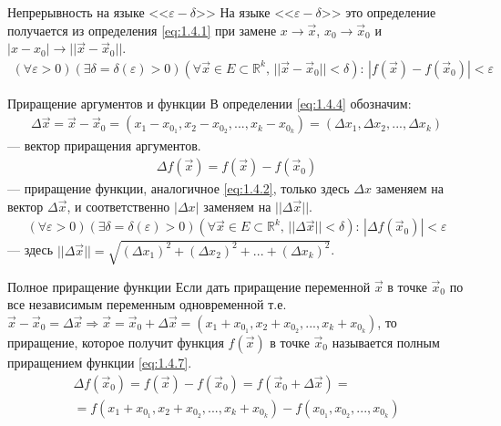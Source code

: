 \begin{tbox}{Непрерывность на языке <<$\varepsilon - \delta$>>}
	На языке <<$\varepsilon - \delta$>> это определение получается из определения \cref{eq:1.4.1} при замене $x \to \vec{x}$, $x_0 \to \vec{x}_0$ и $|x - x_0| \to ||\vec{x} - \vec{x}_0||$.
	\begin{align} \label{eq:1.4.4}
		(\forall \varepsilon > 0)(\exists \delta = \delta(\varepsilon) > 0)(\forall \vec{x} \in E \subset \mathbb{R}^k, \, ||\vec{x} - \vec{x}_0|| < \delta): \, |f(\vec{x}) - f(\vec{x}_0)| < \varepsilon
	\end{align}
\end{tbox}

\begin{tbox}{Приращение аргументов и функции}
	В определении \cref{eq:1.4.4} обозначим:
	\begin{align}
		\Delta \vec{x} = \vec{x} - \vec{x}_0 = (x_1 - x_\text{$0_1$}, x_2 - x_\text{$0_2$}, ..., x_k - x_\text{$0_k$}) = (\Delta x_1, \Delta x_2, ..., \Delta x_k)
	\end{align}
	--- вектор приращения аргументов.
	\begin{align} \label{eq:1.4.5}
		\Delta f(\vec{x}) = f(\vec{x}) - f(\vec{x}_0)
	\end{align}
	--- приращение функции, аналогичное \cref{eq:1.4.2}, только здесь $\Delta x$ заменяем на вектор $\Delta \vec{x}$, и соответственно $|\Delta x|$ заменяем на $||\Delta \vec{x}||$.
	\begin{align} \label{eq:1.4.6}
		(\forall \varepsilon > 0)(\exists \delta = \delta(\varepsilon) > 0)(\forall \vec{x} \in E \subset \mathbb{R}^k, \, ||\Delta \vec{x}|| < \delta): \, |\Delta f(\vec{x}_0)| < \varepsilon
	\end{align}
	--- здесь \(||\Delta \vec{x}|| = \sqrt{(\Delta x_1)^2 + (\Delta x_2)^2 + ... + (\Delta x_k)^2}\).
\end{tbox}

\begin{tbox}{Полное приращение функции}
	Если дать приращение переменной $\vec{x}$ в точке $\vec{x}_0$ по все независимым переменным одновременной т.е. $\vec{x} - \vec{x}_0 = \Delta \vec{x} \Rightarrow \vec{x} = \vec{x}_0 + \Delta \vec{x} = (x_1 + x_\text{$0_1$}, x_2 + x_\text{$0_2$}, ..., x_k + x_\text{$0_k$})$, то приращение, которое получит функция $f(\vec{x})$ в точке $\vec{x}_0$ называется полным приращением функции \cref{eq:1.4.7}.
	\begin{multline} \label{eq:1.4.7}
		\Delta f(\vec{x}_0) = f(\vec{x}) - f(\vec{x}_0) = f(\vec{x}_0 + \Delta \vec{x}) =\\= f(x_1 + x_\text{$0_1$}, x_2 + x_\text{$0_2$}, ..., x_k + x_\text{$0_k$}) - f(x_\text{$0_1$}, x_\text{$0_2$}, ..., x_\text{$0_k$})
	\end{multline}
\end{tbox}

